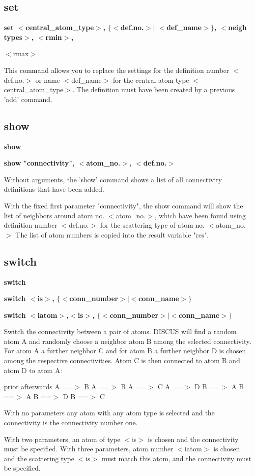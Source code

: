 \subsection*{set}
{\bf set $ <$central\_atom\_type$> $, $ \{$$ <$def.no.$> $$| $ $ <$def\_name$> $$\} $, $ <$neigh types$> $, $ <$rmin$> $, \par }
\vspace{3pt}
                                                                 $ <$rmax$> $ 
\par
This command allows you to replace the settings for the definition 
number $ <$def.no.$> $ or name $ <$def\_name$> $ for the central atom type 
$ <$central\_atom\_type$> $. 
The definition must have been created by a previous 'add' command. 
\subsection*{show}
{\bf show \par }
{\bf show "connectivity", $ <$atom\_no.$> $, $ <$def.no.$> $ \par }
\par
\vspace{3pt}
Without arguments, the 'show' command shows a list of all 
connectivity definitions that have been added. 
\par
With the fixed first parameter "connectivity", the show command will 
show the list of neighbors around atom no. $ <$atom\_no.$> $, which have 
been found using definition number $ <$def.no.$> $ for the scattering 
type of atom no. $ <$atom\_no.$> $ 
The list of atom numbers is copied into the result variable "res". 
\subsection*{switch}
{\bf switch \par }
{\bf switch $ <$is$> $, $ \{$$ <$conn\_number$> $$| $$ <$conn\_name$> $$\} $ \par }
{\bf switch $ <$iatom$> $,$ <$is$> $, $ \{$$ <$conn\_number$> $$| $$ <$conn\_name$> $$\} $ \par }
\par
\vspace{3pt}
Switch the connectivity between a pair of atoms. 
DISCUS will find a random atom A and randomly choose a neighbor 
atom B among the selected connectivity. For atom A a further 
neighbor C and for atom B a further neighbor D is chosen among 
the respective connectivities. Atom C is then connected to 
atom B and atom D to atom A: 
\par
prior     afterwards 
A ==$> $ B   A ==$> $ B 
A ==$> $ C   A ==$> $ D 
B ==$> $ A   B ==$> $ A 
B ==$> $ D   B ==$> $ C 
\par
With no parameters any atom with any atom type is selected and 
the connectivity is the connectivity number one. 
\par
With two parameters, an atom of type $ <$is$> $ is chosen and the 
connectivity must be specified. 
With three parameters, atom number $ <$iatom$> $ is chosen and the 
scattering type $ <$is$> $ must match this atom, and the 
connectivity must be specified. 
